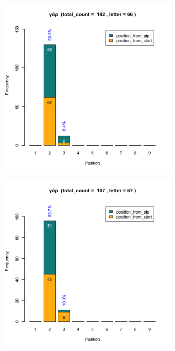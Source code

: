\documentclass[a4paper]{article}
\begin{document}
\begin{figure}
\begin{subfigure}{0.45\textwidth}
\centering
\includegraphics[width=1\linewidth]{../../data/output/paul_R_par/plots/par1_lt66.png}
\end{subfigure}
\begin{subfigure}{0.45\textwidth}
\centering
\includegraphics[width=1\linewidth]{../../data/output/paul_R_par/plots/par1_lt67.png}

\end{subfigure}
\end{figure}
\end{document}
